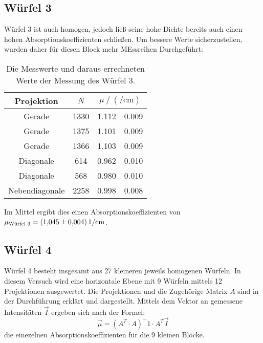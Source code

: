   \subsection{Würfel 3}
    Würfel 3 ist auch homogen, jedoch ließ seine hohe Dichte bereits auch einen hohen Absorptionskoeffizienten schließen. 
    Um bessere Werte sicherzustellen, wurden daher für diesen Block mehr MEssreihen Durchgeführt:
    \begin{table}[H]
     \centering
     \caption{Die Messwerte und daraus errechneten Werte der Messung des Würfel 3.}
     \label{tab:w2}
     \begin{tabular}{c S[table-format=4.0] S[table-format=1.3] @{${}\pm{}$} S[table-format=1.3]}
       \toprule
       {Projektion} &  &  \\
       \midrule
       Gerade & 1330 & 1.112 & 0.009 \\
       Gerade & 1375 & 1.101 & 0.009 \\
       Gerade & 1366 & 1.103 & 0.009 \\
       Diagonale & 614 & 0.962 & 0.010 \\
       Diagonale & 568 & 0.980 & 0.010 \\
       Nebendiagonale & 2258 & 0.998 & 0.008 \\
       \bottomrule  
     \end{tabular}
    \end{table} 
    Im Mittel ergibt dies einen Absorptionskoeffizienten von $\mu_\t{Würfel 3} = \SI{1.045(0004)}{1\per\centi\metre}$.

  \subsection{Würfel 4}
    Würfel 4 besteht insgesamt aus 27 kleineren jeweils homogenen Würfeln.
    In diesem Versuch wird eine horizontale Ebene mit 9 Würfeln mittels 12 Projektionen ausgewertet.
    Die Projektionen und die Zugehörige Matrix $A$ sind in der Durchführung erklärt und dargestellt.
    Mittels dem Vektor an gemessene Intensitäten $\vec{I}$ ergeben sich nach der Formel:
    \begin{equation}
      \vec{\mu} = \left( A^T \cdot A \right)^-1 \cdot A^T \vec{I}
    \end{equation}
    die einezelnen Absorptionskoeffizienten für die 9 kleinen Blöcke.